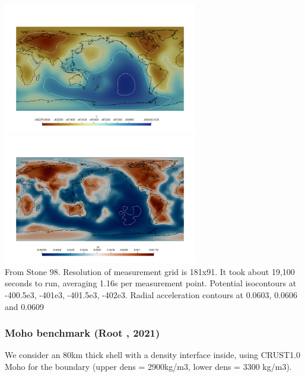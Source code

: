 \begin{center}
\includegraphics[width=8.5cm]{python_codes/fieldstone_98/images/U}
\includegraphics[width=8.5cm]{python_codes/fieldstone_98/images/gr}\\
{\captionfont From Stone 98. Resolution of measurement grid is 181x91. It took 
about 19,100 seconds to run, averaging 1.16s per measurement point.  
Potential isocontours at -400.5e3, -401e3, -401.5e3, -402e3. 
Radial acceleration contours at 0.0603, 0.0606 and 0.0609}
\end{center}




\newpage
\subsubsection{Moho benchmark (Root \etal, 2021)}

We consider an 80km thick shell with a density interface inside, using CRUST1.0 Moho 
for the boundary (upper dens = 2900kg/m3, lower dens = 3300 kg/m3).




